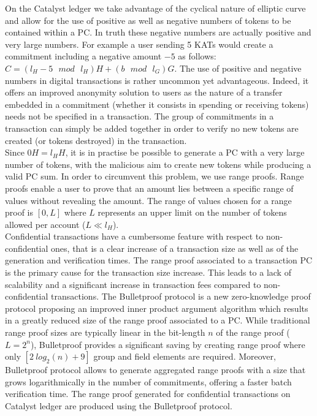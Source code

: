 On the Catalyst ledger we take advantage of the cyclical nature of elliptic curve and allow for the use of positive as well as negative numbers of tokens to be contained within a PC. In truth these negative numbers are actually positive and very large numbers. For example a user sending 5 KATs would create a commitment including a negative amount $-5$ as follows: $C = (l_H - 5 \text{ $mod$ } l_H) H + (b \text{ $mod$ } l_G) G$. The use of positive and negative numbers in digital transactions is rather uncommon yet advantageous. Indeed, it offers an improved anonymity solution to users as the nature of a transfer embedded in a commitment (whether it consists in spending or receiving tokens) needs not be specified in a transaction. The group of commitments in a transaction can simply be added together in order to verify no new tokens are created (or tokens destroyed) in the transaction. \\

Since $0H=l_HH$, it is in practise be possible to generate a PC with a very large number of tokens, with the malicious aim to create new tokens while producing a valid PC sum. In order to circumvent this problem, we use range proofs. Range proofs enable a user to prove that an amount lies between a specific range of values without revealing the amount. The range of values chosen for a range proof is $[0,L]$ where $L$ represents an upper limit on the number of tokens allowed per account ($L \ll l_H$).\\

Confidential transactions have a cumbersome feature with respect to non-confidential ones, that is a clear increase of a transaction size as well as of the generation and verification times. The range proof associated to a transaction PC is the primary cause for the transaction size increase. This leads to a lack of scalability and a significant increase in transaction fees compared to non-confidential transactions. The Bulletproof protocol is a new zero-knowledge proof protocol \cite{bulletproof} proposing an improved inner product argument algorithm which results in a greatly reduced size of the range proof associated to a PC.  While traditional range proof sizes are typically linear in the bit-length $n$ of the range proof ($L = 2^n$), Bulletproof provides a significant saving by creating range proof where only $[2~log_2(n) + 9]$ group and field elements are required. Moreover, Bulletproof protocol allows to generate aggregated range proofs with a size that grows logarithmically in the number of commitments, offering a faster batch verification time.  The range proof generated for confidential transactions on Catalyst ledger are produced using the Bulletproof protocol. 
